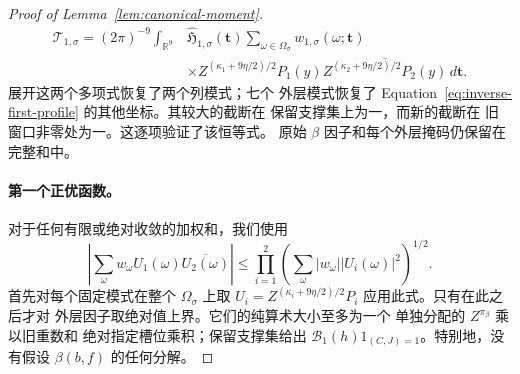 \documentclass[11pt,a4paper]{article}
\numberwithin{equation}{section}
\numberwithin{figure}{section}
\theoremstyle{definition}
\theoremstyle{remark}
\begin{document}
\begin{proof}[Proof of Lemma~\ref{lem:canonical-moment}]
\begin{equation}
 \begin{split}
 \mathcal T_{1,\sigma}=(2\pi)^{-9}\int_{\mathbb R^9}
 &\widehat{\mathfrak H}_{1,\sigma}(\boldsymbol t)
 \sum_{\omega\in\Omega_\sigma}w_{1,\sigma}(\omega;\boldsymbol t)\\
 &\times Z^{(\kappa_1+9\eta/2)/2}P_1(y)
       \overline{Z^{(\kappa_2+9\eta/2)/2}P_2(y)}\,d\boldsymbol t.
 \end{split}
\end{equation}
展开这两个多项式恢复了两个列模式；七个
外层模式恢复了
Equation~\eqref{eq:inverse-first-profile} 的其他坐标。其较大的截断在
保留支撑集上为一，而新的截断在
旧窗口非零处为一。这逐项验证了该恒等式。
原始 \(\beta\) 因子和每个外层掩码仍保留在
完整和中。

\paragraph{第一个正优函数。}
对于任何有限或绝对收敛的加权和，我们使用
\begin{equation}\tag{D}\label{eq:weighted-cauchy}
 \left|\sum_\omega w_\omega U_1(\omega)\overline{U_2(\omega)}\right|
 \le\prod_{i=1}^2
       \left(\sum_\omega|w_\omega||U_i(\omega)|^2\right)^{1/2}.
\end{equation}
首先对每个固定模式在整个
\(\Omega_\sigma\) 上取 \(U_i=Z^{(\kappa_i+9\eta/2)/2}P_i\) 应用此式。只有在此之后才对
外层因子取绝对值上界。它们的纯算术大小至多为一个
单独分配的 \(Z^{\pi_\beta}\) 乘以旧重数和
绝对指定槽位乘积；保留支撑集给出
\(\mathcal B_1(h)1_{(C,J)=1}\)。特别地，没有假设
\(\beta(b,f)\) 的任何分解。


\end{proof}
\end{document}

